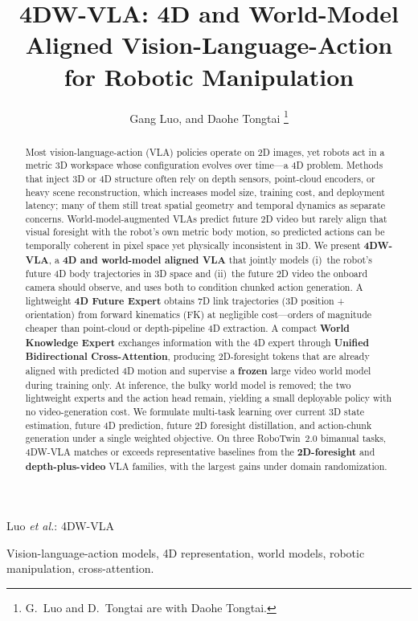 \documentclass[journal]{IEEEtran}
\begin{document}
\title{4DW-VLA: 4D and World-Model Aligned Vision-Language-Action for Robotic Manipulation}

\author{Gang Luo, 
        and Daohe Tongtai%
\thanks{G.~Luo and D.~Tongtai are with Daohe Tongtai.}%
}

%
{Luo \MakeLowercase{\textit{et al.}}: 4DW-VLA}

\maketitle

\begin{abstract}
Most vision-language-action (VLA) policies operate on 2D images, yet robots act in a metric 3D workspace whose configuration evolves over time---a 4D problem. Methods that inject 3D or 4D structure often rely on depth sensors, point-cloud encoders, or heavy scene reconstruction, which increases model size, training cost, and deployment latency; many of them still treat spatial geometry and temporal dynamics as separate concerns. World-model-augmented VLAs predict future 2D video but rarely align that visual foresight with the robot's own metric body motion, so predicted actions can be temporally coherent in pixel space yet physically inconsistent in 3D. We present \textbf{4DW-VLA}, a \textbf{4D and world-model aligned VLA} that jointly models (i)~the robot's future 4D body trajectories in 3D space and (ii)~the future 2D video the onboard camera should observe, and uses both to condition chunked action generation. A lightweight \textbf{4D Future Expert} obtains 7D link trajectories (3D position + orientation) from forward kinematics (FK) at negligible cost---orders of magnitude cheaper than point-cloud or depth-pipeline 4D extraction. A compact \textbf{World Knowledge Expert} exchanges information with the 4D expert through \textbf{Unified Bidirectional Cross-Attention}, producing 2D-foresight tokens that are already aligned with predicted 4D motion and supervise a \textbf{frozen} large video world model during training only. At inference, the bulky world model is removed; the two lightweight experts and the action head remain, yielding a small deployable policy with no video-generation cost. We formulate multi-task learning over current 3D state estimation, future 4D prediction, future 2D foresight distillation, and action-chunk generation under a single weighted objective. On three RoboTwin~2.0 bimanual tasks, 4DW-VLA matches or exceeds representative baselines from the \textbf{2D-foresight} and \textbf{depth-plus-video} VLA families, with the largest gains under domain randomization.
\end{abstract}

\begin{IEEEkeywords}
Vision-language-action models, 4D representation, world models, robotic manipulation, cross-attention.
\end{IEEEkeywords}





\end{document}
